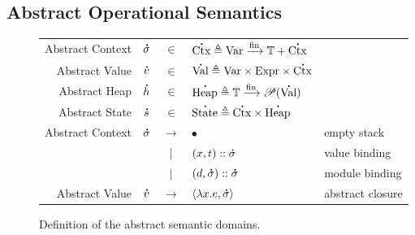 \documentclass{article}
\theoremstyle{definition}
\newcommand*{\vbar}{|}
\newcommand*{\cons}{::}
\newcommand*{\pset}{\mathscr{P}}
\newcommand*{\A}[1]{\overset{{\,_{\mbox{\Large .}}}}{#1}}
\newcommand*{\Expr}{\text{Expr}}
\newcommand*{\ExprVar}{\text{Var}}
\newcommand*{\modid}{d}
\newcommand*{\Time}{\mathbb{T}}
\newcommand*{\Ctx}{\text{Ctx}}
\newcommand*{\ctx}{\sigma}
\newcommand*{\Value}{\text{Val}}
\newcommand*{\Mem}{\text{Heap}}
\newcommand*{\mem}{h}
\newcommand*{\State}{\text{State}}
\newcommand*{\fin}[2]{{#1}\xrightarrow{\text{fin}}{#2}}
\begin{document}
\subsection{Abstract Operational Semantics}
\begin{figure}[h!]
  \centering
  \begin{tabular}{rrcll}
    Abstract Context & $\A\ctx$ & $\in$         & $\A\Ctx\triangleq\fin{\ExprVar}{\Time+\A\Ctx}$                         \\
    Abstract Value   & $\A{v}$  & $\in$         & $\A\Value\triangleq\ExprVar\times\Expr\times\A\Ctx$                    \\
    Abstract Heap    & $\A\mem$ & $\in$         & $\A\Mem\triangleq\fin{\Time}{\pset(\A\Value)}$                         \\
    Abstract State   & $\A{s}$  & $\in$         & $\A\State\triangleq\A\Ctx\times\A\Mem$                                 \\
    Abstract Context & $\A\ctx$ & $\rightarrow$ & $\bullet$                                           & empty stack      \\
                     &          & $\vbar$       & $(x,t)\cons \A\ctx$                                 & value binding    \\
                     &          & $\vbar$       & $(\modid,\A\ctx)\cons \A\ctx$                       & module binding   \\
    Abstract Value   & $\A{v}$  & $\rightarrow$ & $\langle \lambda x.e, \A\ctx \rangle$               & abstract closure
  \end{tabular}
  \caption{Definition of the abstract semantic domains.}
  \label{fig:absdom}
\end{figure}
\end{document}
